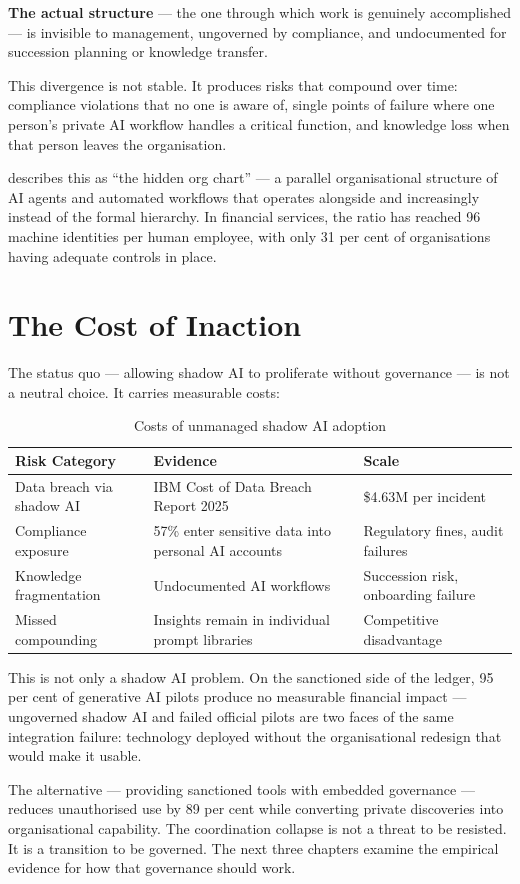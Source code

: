 \textbf{The actual structure} --- the one through which work is genuinely accomplished --- is invisible to management, ungoverned by compliance, and undocumented for succession planning or knowledge transfer.

This divergence is not stable. It produces risks that compound over time: compliance violations that no one is aware of, single points of failure where one person's private AI workflow handles a critical function, and knowledge loss when that person leaves the organisation.

\textcite{CyberArk2025} describes this as ``the hidden org chart'' --- a parallel organisational structure of AI agents and automated workflows that operates alongside and increasingly instead of the formal hierarchy. In financial services, the ratio has reached 96 machine identities per human employee, with only 31 per cent of organisations having adequate controls in place.

\section{The Cost of Inaction}

The status quo --- allowing shadow AI to proliferate without governance --- is not a neutral choice. It carries measurable costs:

\begin{table}[h]
\centering
\caption{Costs of unmanaged shadow AI adoption}
\label{tab:shadow-ai-costs}
\begin{tabularx}{\textwidth}{L{4cm}L{5cm}X}
\toprule
\textbf{Risk Category} & \textbf{Evidence} & \textbf{Scale} \\
\midrule
Data breach via shadow AI & IBM Cost of Data Breach Report 2025 & \$4.63M per incident \\
Compliance exposure & 57\% enter sensitive data into personal AI accounts & Regulatory fines, audit failures \\
Knowledge fragmentation & Undocumented AI workflows & Succession risk, onboarding failure \\
Missed compounding & Insights remain in individual prompt libraries & Competitive disadvantage \\
\bottomrule
\end{tabularx}
\end{table}

This is not only a shadow AI problem. On the sanctioned side of the ledger, 95 per cent of generative AI pilots produce no measurable financial impact \parencite{MITNANDA2025} --- ungoverned shadow AI and failed official pilots are two faces of the same integration failure: technology deployed without the organisational redesign that would make it usable.

The alternative --- providing sanctioned tools with embedded governance --- reduces unauthorised use by 89 per cent while converting private discoveries into organisational capability. The coordination collapse is not a threat to be resisted. It is a transition to be governed. The next three chapters examine the empirical evidence for how that governance should work.
